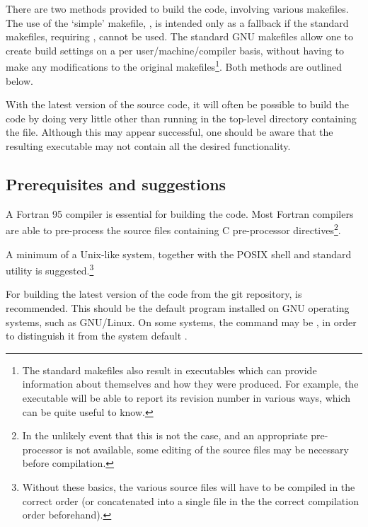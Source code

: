 There are two methods provided to build the code, involving various
makefiles. The use of the `simple' makefile, , is intended
only as a fallback if the standard makefiles, requiring ,
cannot be used.  The standard GNU makefiles
allow one to create build settings on a per user/machine/compiler basis,
without having to make any modifications to the original makefiles\footnote{
The standard makefiles also result in executables which can
provide information about themselves and how they were produced. For example,
the executable will be able to report its revision number in various ways,
which can be quite useful to know.}.
Both methods are outlined below.

With the latest version of the source code, it will often be possible to
build the code by doing very little other than running  in
the top-level directory containing the  file.
Although this may appear successful, one should be aware that the resulting
executable may not contain all the desired functionality.


\subsection{Prerequisites and suggestions}

A Fortran 95 compiler is essential for building the code. Most Fortran
compilers are able to pre-process the source files containing C
pre-processor directives\footnote{In the unlikely event that this is not the case,
and an appropriate pre-processor is not available, some editing of the
source files may be necessary before compilation.}.

A minimum of a Unix-like system, together with the POSIX shell and standard
 utility is suggested.\footnote{Without these basics, the various source files will have to be
compiled in the correct order (or concatenated into a single file in the the
correct compilation order beforehand).}

For building the latest version of the code from the git repository,
\href{http://www.gnu.org./software/make/}{} is recommended.
This should be the default
 program installed on GNU operating systems, such as GNU/Linux.
On some systems, the command may be , in order to distinguish it
from the system default .

